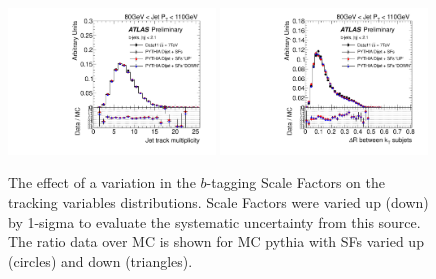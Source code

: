 \begin{figure}[tp]
\centering
\includegraphics[width=0.49\textwidth]{FIGS/systematics/BTagCalib_DataVarNtrkPT080.pdf}
\includegraphics[width=0.49\textwidth]{FIGS/systematics/BTagCalib_DataVarDRktaxisPT080.pdf}
\caption{The effect of a variation in the $b$-tagging Scale Factors on the tracking variables distributions. Scale Factors were varied up (down) by 1-sigma to evaluate the systematic uncertainty from this source. The ratio data over MC is shown for MC {\sc pythia} with SFs varied up (circles) and down (triangles).}
\label{fig:btaggingSFs}
\end{figure}


